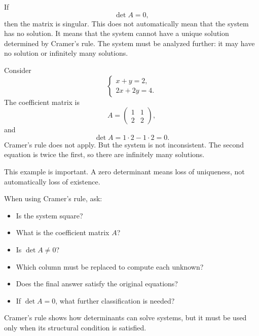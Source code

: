 If
\[
\det A=0,
\]
then the matrix is singular. This does not automatically mean that the system has no solution. It means that the system cannot have a unique solution determined by Cramer's rule. The system must be analyzed further: it may have no solution or infinitely many solutions.

\begin{examplebox}
Consider
\[
\begin{cases}
x+y=2,\\
2x+2y=4.
\end{cases}
\]
The coefficient matrix is
\[
A=\begin{pmatrix}
1&1\\
2&2
\end{pmatrix},
\]
and
\[
\det A=1\cdot2-1\cdot2=0.
\]
Cramer's rule does not apply. But the system is not inconsistent. The second equation is twice the first, so there are infinitely many solutions.
\end{examplebox}

This example is important. A zero determinant means loss of uniqueness, not automatically loss of existence.

\begin{summarybox}
When using Cramer's rule, ask:
\begin{itemize}
\item Is the system square?
\item What is the coefficient matrix \(A\)?
\item Is \(\det A\ne0\)?
\item Which column must be replaced to compute each unknown?
\item Does the final answer satisfy the original equations?
\item If \(\det A=0\), what further classification is needed?
\end{itemize}
\end{summarybox}

Cramer's rule shows how determinants can solve systems, but it must be used only when its structural condition is satisfied.